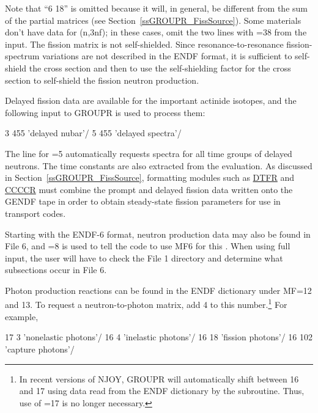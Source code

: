 \noindent
Note that ``6 18'' is omitted because it will, in general, be different
from the sum of the partial matrices (see Section~\ref{ssGROUPR_FissSource}).
Some materials don't have data for (n,3nf); in these cases, omit the two
lines with =38 from the input.  The fission matrix is not
self-shielded.  Since resonance-to-resonance fission-spectrum variations
are not described in the ENDF format, it is sufficient to self-shield
the cross section and then to use the self-shielding factor for the
cross section to self-shield the fission neutron production.

Delayed fission data are available for the important actinide isotopes,
and the following input to GROUPR is used to process them:

\small
\begin{ccode}

   3 455 'delayed nubar'/
   5 455 'delayed spectra'/

\end{ccode}
\normalsize

\noindent
The line for =5 automatically requests spectra for all time groups
of delayed neutrons.  The time constants are also extracted from
the evaluation.  As discussed in Section~\ref{ssGROUPR_FissSource},
formatting modules such as \hyperlink{sDTFRhy}{DTFR} and
\hyperlink{sCCCCRhy}{CCCCR} must combine the prompt and delayed
fission data written onto the GENDF tape in order to obtain steady-state
fission parameters for use in transport codes.

Starting with the ENDF-6 format, neutron production data may also be
found in File 6, and =8 is used to tell the code
to use MF6 for this .  When using full input, the user
will have to check the File 1 directory and determine what subsections
occur in File 6.

Photon production reactions can be found in the ENDF dictionary under
MF=12 and 13.  To request a neutron-to-photon matrix, add 4 to this
number.\footnote{In recent versions of NJOY, GROUPR will automatically
shift between 16 and 17 using data read from the ENDF dictionary by
the  subroutine.  Thus, use of =17 is no longer
necessary.}  For example,

\small
\begin{ccode}

   17   3 'nonelastic photons'/
   16   4 'inelastic photons'/
   16  18 'fission photons'/
   16 102 'capture photons'/

\end{ccode}
\normalsize

